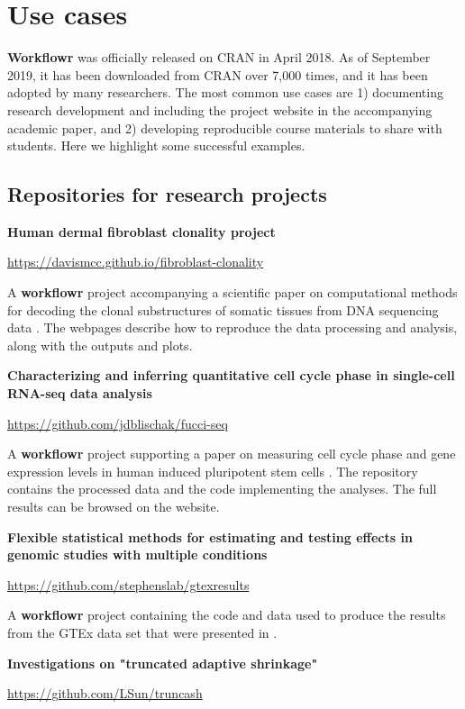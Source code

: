 \documentclass[9pt,a4paper]{extarticle}
\begin{document}
\section*{Use cases}

 \textbf{Workflowr} was officially released on CRAN in April 2018. As of September
2019, it has been downloaded from CRAN over 7,000 times, and it has been
adopted by many researchers. The most common use cases are 1)
documenting research development and including the project website in
the accompanying academic paper, and 2) developing reproducible course
materials to share with students. Here we highlight some successful
examples.

\subsection*{Repositories for research projects}

\textbf{Human dermal fibroblast clonality project}

\url{https://davismcc.github.io/fibroblast-clonality}

A \textbf{workflowr} project accompanying a scientific paper on computational
methods for decoding the clonal substructures of somatic tissues from
DNA sequencing data \cite{McCarthy2018}. The webpages describe how to
reproduce the data processing and analysis, along with the outputs and
plots.

\textbf{Characterizing and inferring quantitative cell cycle phase in
single-cell RNA-seq data analysis}

\url{https://github.com/jdblischak/fucci-seq}

A \textbf{workflowr} project supporting a paper on measuring cell cycle phase and
gene expression levels in human induced pluripotent stem cells
\cite{Hsiao2019}. The repository contains the processed data and the
code implementing the analyses. The full results can be browsed on the
website.

\textbf{Flexible statistical methods for estimating and testing effects
in genomic studies with multiple conditions}

\url{https://github.com/stephenslab/gtexresults}

A \textbf{workflowr} project containing the code and data used to produce the
results from the GTEx data set that were presented in \cite{Urbut2019}.

\textbf{Investigations on "truncated adaptive shrinkage"}

\url{https://github.com/LSun/truncash}
\end{document}
